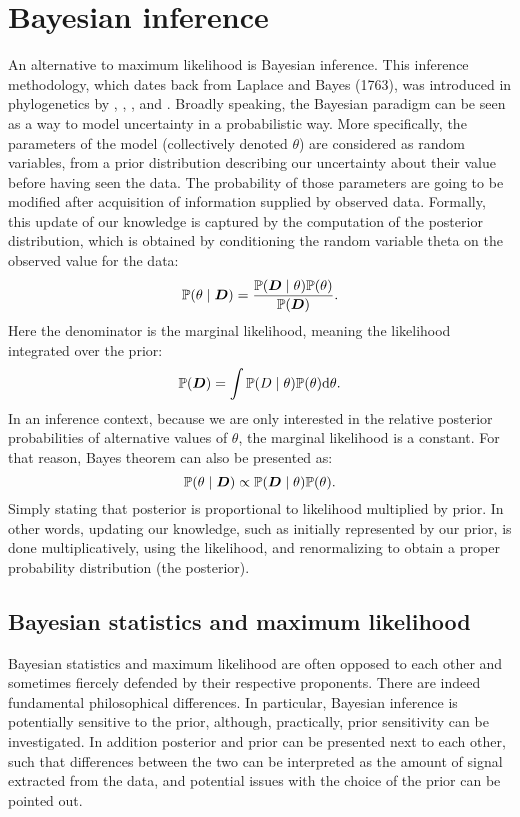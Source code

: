 \section{Bayesian inference}
\label{sec:intro-bayesian}

An alternative to maximum likelihood is Bayesian inference.
This inference methodology, which dates back from Laplace and Bayes (1763), was introduced in phylogenetics by \citet{Yang1997}, \citet{Mau1999}, \citet{Larget1999}, \citet{Li2000} and \citet{Huelsenbeck2001}.
Broadly speaking, the Bayesian paradigm can be seen as a way to model uncertainty in a probabilistic way.
More specifically, the parameters of the model (collectively denoted $\theta$) are considered as random variables, from a prior distribution describing our uncertainty about their value before having seen the data.
The probability of those parameters are going to be modified after acquisition of information supplied by observed data.
Formally, this update of our knowledge is captured by the computation of the posterior distribution, which is obtained by conditioning the random variable theta on the observed value for the data:
\begin{equation}
    \mathbb{P} (\theta \mid \bm{D})=\frac{\mathbb{P} (\bm{D} \mid \theta)\mathbb{P} (\theta)}{\mathbb{P} (\bm{D})}.
\end{equation}
Here the denominator is the marginal likelihood, meaning the likelihood integrated over the prior:
\begin{equation}
    \mathbb{P} (\bm{D}) = \int \mathbb{P} (D \mid \theta) \mathbb{P} (\theta) \mathrm{d} \theta.
\end{equation}
In an inference context, because we are only interested in the relative posterior probabilities of alternative values of $\theta$, the marginal likelihood is a constant.
For that reason, Bayes theorem can also be presented as:
\begin{equation}
    \mathbb{P} (\theta \mid \bm{D}) \propto \mathbb{P} (\bm{D} \mid \theta)\mathbb{P} (\theta).
\end{equation}
Simply stating that posterior is proportional to likelihood multiplied by prior.
In other words, updating our knowledge, such as initially represented by our prior, is done multiplicatively, using the likelihood, and renormalizing to obtain a proper probability distribution (the posterior).

\subsection{Bayesian statistics and maximum likelihood}
\label{subsec:bayesian-statistics-and-maximum-likelihood}
Bayesian statistics and maximum likelihood are often opposed to each other and sometimes fiercely defended by their respective proponents.
There are indeed fundamental philosophical differences.
In particular, Bayesian inference is potentially sensitive to the prior, although, practically, prior sensitivity can be investigated.
In addition posterior and prior can be presented next to each other, such that differences between the two can be interpreted as the amount of signal extracted from the data, and potential issues with the choice of the prior can be pointed out.

